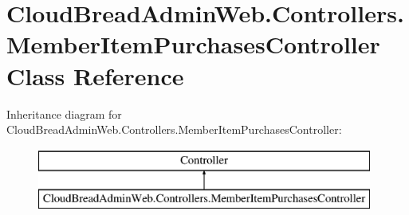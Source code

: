 \hypertarget{a00142}{}\section{Cloud\+Bread\+Admin\+Web.\+Controllers.\+Member\+Item\+Purchases\+Controller Class Reference}
\label{a00142}
Inheritance diagram for Cloud\+Bread\+Admin\+Web.\+Controllers.\+Member\+Item\+Purchases\+Controller\+:\begin{figure}[H]
\begin{center}
\leavevmode
\includegraphics[height=2.000000cm]{a00142}
\end{center}
\end{figure}
